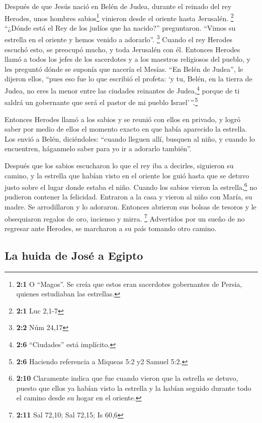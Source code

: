  Después de que Jesús nació en Belén de Judea, durante el
reinado del rey Herodes, unos hombres sabios\footnote{\textbf{2:1} O
  ``Magos''. Se creía que estos eran sacerdotes gobernantes de Persia,
  quienes estudiaban las estrellas.} vinieron desde el oriente hasta
Jerusalén. \footnote{\textbf{2:1} Luc 2,1-7}  ``¿Dónde
está el Rey de los judíos que ha nacido?'' preguntaron. ``Vimos su
estrella en el oriente y hemos venido a adorarlo''. \footnote{\textbf{2:2}
  Núm 24,17}  Cuando el rey Herodes escuchó esto, se
preocupó mucho, y toda Jerusalén con él.  Entonces Herodes
llamó a todos los jefes de los sacerdotes y a los maestros religiosos
del pueblo, y les preguntó dónde se suponía que nacería el Mesías.
 ``En Belén de Judea'', le dijeron ellos, ``pues eso fue
lo que escribió el profeta:  `y tu, Belén, en la tierra de
Judea, no eres la menor entre las ciudades reinantes de
Judea,\footnote{\textbf{2:6} ``Ciudades'' está implícito.} porque de ti
saldrá un gobernante que será el pastor de mi pueblo
Israel'\,''.\footnote{\textbf{2:6} Haciendo referencia a Miqueas 5:2 y2
  Samuel 5:2.}

 Entonces Herodes llamó a los sabios y se reunió con ellos
en privado, y logró saber por medio de ellos el momento exacto en que
había aparecido la estrella.  Los envió a Belén,
diciéndoles: ``cuando lleguen allí, busquen al niño, y cuando lo
encuentren, háganmelo saber para yo ir a adorarlo también''.

 Después que los sabios escucharon lo que el rey iba a
decirles, siguieron su camino, y la estrella que habían visto en el
oriente los guió hasta que se detuvo justo sobre el lugar donde estaba
el niño.  Cuando los sabios vieron la
estrella,\footnote{\textbf{2:10} Claramente indica que fue cuando vieron
  que la estrella se detuvo, puesto que ellos ya habían visto la
  estrella y la habían seguido durante todo el camino desde su hogar en
  el oriente.} no pudieron contener la felicidad. 
Entraron a la casa y vieron al niño con María, su madre. Se arrodillaron
y lo adoraron. Entonces abrieron sus bolsas de tesoros y le obsequiaron
regalos de oro, incienso y mirra. \footnote{\textbf{2:11} Sal 72,10; Sal
  72,15; Is 60,6}  Advertidos por un sueño de no regresar
ante Herodes, se marcharon a su país tomando otro camino.

\hypertarget{la-huida-de-josuxe9-a-egipto}{%
\subsection{La huida de José a
Egipto}\label{la-huida-de-josuxe9-a-egipto}}

